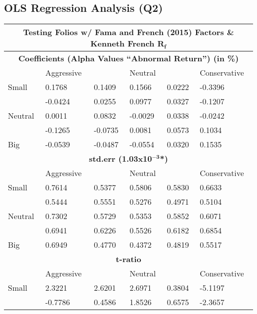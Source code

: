 \documentclass[11pt, english]{article}
\begin{document}
\newpage

	\subsection{OLS Regression Analysis (Q2)}

\begin{center}
	\scriptsize
\begin{longtable}{ p{1.5cm} | p{1.5cm} p{1.5cm} p{1.5cm} p{1.5cm} p{1.5cm} }
        \hline
        \hline
        \multicolumn{6}{c}{\textbf{Testing Folios w/ Fama and French (2015) Factors \& Kenneth French R$\mathbf{_f}$}}\\
        \hline
        \hline
        \multicolumn{6}{c}{\textbf{Coefficients (Alpha Values ``Abnormal Return'') (in \%)}}\\
        \hline
        & Aggressive & & Neutral & & Conservative\\
        \hline
        Small & 0.1768 & 0.1409 & 0.1566 & 0.0222 & -0.3396\\
        & -0.0424 & 0.0255 & 0.0977 & 0.0327 & -0.1207\\
        Neutral & 0.0011 & 0.0832 & -0.0029 & 0.0338 & -0.0242\\
        & -0.1265 & -0.0735 & 0.0081 & 0.0573 & 0.1034\\
        Big & -0.0539 & -0.0487 & -0.0554 & 0.0320 & 0.1535\\
        \hline
        \multicolumn{6}{c}{\textbf{std.err (1.03x10$\mathbf{^{-3}}$*)}}\\
        \hline
        & Aggressive & & Neutral & & Conservative\\
        \hline
        Small & 0.7614 & 0.5377 & 0.5806 & 0.5830 & 0.6633\\
        & 0.5444 & 0.5551 & 0.5276 & 0.4971 & 0.5104\\
        Neutral & 0.7302 & 0.5729 & 0.5353 & 0.5852 & 0.6071\\
        & 0.6941 & 0.6226 & 0.5526 & 0.6182 & 0.6854\\
        Big & 0.6949 & 0.4770 & 0.4372 & 0.4819 & 0.5517\\
        \hline
        \multicolumn{6}{c}{\textbf{t-ratio}}\\
        \hline
        & Aggressive & & Neutral & & Conservative\\
        \hline
        Small & 2.3221 & 2.6201 & 2.6971 & 0.3804 & -5.1197\\
        & -0.7786 & 0.4586 & 1.8526 & 0.6575 & -2.3657\\

\end{longtable}
\end{center}
\end{document}
